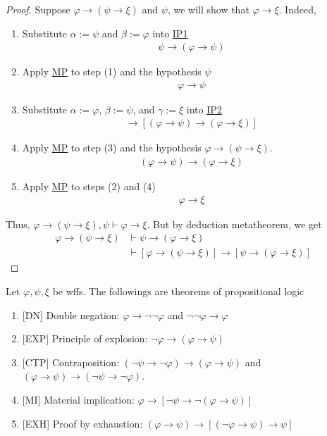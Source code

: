 \documentclass{treatise}
\begin{document}
\begin{proof}
Suppose $\varphi \to (\psi \to \xi)$ and $\psi$, we will show that $\varphi \to \xi$. Indeed,
\begin{enumerate}
    \item Substitute $\alpha := \psi$ and $\beta := \varphi$ into \hyperref[HPL-A-IP1]{IP1}
    \begin{align*}
        \psi \to (\varphi \to \psi)
    \end{align*}
    \item Apply \hyperref[HPL-R-MP]{MP} to step (1) and the hypothesis $\psi$
    \begin{align*}
        \varphi \to \psi
    \end{align*}
    \item Substitute $\alpha := \varphi$, $\beta := \psi$, and $\gamma := \xi$ into \hyperref[HPL-A-IP2]{IP2}
    \begin{align*}
        [\varphi \to (\psi \to \xi)] \to [(\varphi \to \psi) \to (\varphi \to \xi)]
    \end{align*}
    \item Apply \hyperref[HPL-R-MP]{MP} to step (3) and the hypothesis $\varphi \to (\psi \to \xi)$.
    \begin{align*}
        (\varphi \to \psi) \to (\varphi \to \xi)
    \end{align*}
    \item Apply \hyperref[HPL-R-MP]{MP} to steps (2) and (4)
    \begin{align*}
        \varphi \to \xi
    \end{align*}
\end{enumerate}
Thus, $\varphi \to (\psi \to \xi), \psi \vdash \varphi \to \xi$. But by deduction metatheorem, we get
\begin{align*}
    \varphi \to (\psi \to \xi) & \vdash \psi \to (\varphi \to \xi)
    \\
    & \vdash [\varphi \to (\psi \to \xi)] \to [\psi \to (\varphi \to \xi)]
\end{align*}
\end{proof}
\begin{proposition} \label{logic-sufficient-completeness}
Let $\varphi, \psi, \xi$ be wffs. The followings are theorems of propositional logic
\begin{enumerate}
    \item \label{HPL-T-DN} [DN] Double negation: $\varphi \to \neg \neg \varphi$ and $\neg \neg \varphi \to \varphi$
    \item \label{HPL-T-EXP} [EXP] Principle of explosion: $\neg \varphi \to (\varphi \to \psi)$
    \item \label{HPL-T-CTP} [CTP] Contraposition: $(\neg \psi \to \neg \varphi) \to (\varphi \to \psi)$ and $(\varphi \to \psi) \to (\neg \psi \to \neg \varphi)$.
    \item \label{HPL-T-MI} [MI] Material implication: $\varphi \to [\neg \psi \to \neg(\varphi \to \psi)]$
    \item \label{HPL-T-EXH} [EXH] Proof by exhaustion: $(\varphi \to \psi) \to [(\neg \varphi \to \psi) \to \psi]$
\end{enumerate}
\end{proposition}
\end{document}
